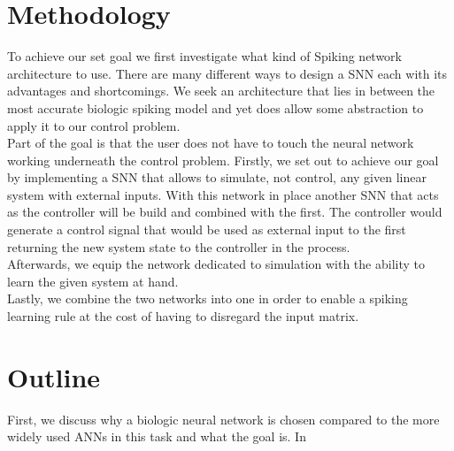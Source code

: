 \section{Methodology}
To achieve our set goal we first investigate what kind of Spiking network architecture to use. There are many different ways to design a \ac{SNN} each with its advantages and shortcomings.
We seek an architecture that lies in between the most accurate biologic spiking model and yet does allow some abstraction to apply it to our control problem.\\
Part of the goal is that the user does not have to touch the neural network working underneath the control problem.
Firstly, we set out to achieve our goal by implementing a \ac{SNN} that allows to simulate, not control, any given linear system with external inputs. With this network in place another \ac{SNN} that acts as the controller will be build and combined with the first. The controller would generate a control signal that would be used as external input to the first returning the new system state to the controller in the process.\\
Afterwards, we equip the network dedicated to simulation with the ability to learn the given system at hand.\\
Lastly, we combine the two networks into one in order to enable a spiking learning rule at the cost of having to disregard the input matrix.\\

\section{Outline}

First, we discuss why a biologic neural network is chosen compared to the more widely used \acp{ANN} in this task and what the goal is. In
